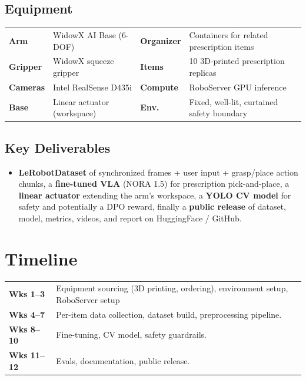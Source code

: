 \documentclass[11.5pt,a4paper]{article}
\begin{document}
\subsection*{Equipment}
\vspace{2pt}
{\normalsize
\begin{tabular}{@{}ll@{\hspace{2.5em}}ll@{}}
\toprule
\textbf{Arm} & WidowX AI Base (6-DOF) & \textbf{Organizer} & Containers for related prescription items \\
\textbf{Gripper} & WidowX squeeze gripper & \textbf{Items} & 10 3D-printed prescription replicas \\
\textbf{Cameras} & Intel RealSense D435i & \textbf{Compute} & RoboServer GPU inference \\
\textbf{Base} & Linear actuator (workspace) & \textbf{Env.} & Fixed, well-lit, curtained safety boundary \\
\bottomrule
\end{tabular}
}

\subsection*{Key Deliverables}
\begin{itemize}
\item \textbf{LeRobotDataset} of synchronized frames + user input + grasp/place action chunks, a \textbf{fine-tuned VLA} (NORA 1.5) for prescription pick-and-place, a \textbf{linear actuator} extending the arm's workspace, a \textbf{YOLO CV model} for safety and potentially a DPO reward, finally a \textbf{public release} of dataset, model, metrics, videos, and report on HuggingFace / GitHub.
\end{itemize}

\section*{Timeline}
\vspace{2pt}
{\normalsize
\begin{tabular}{@{}lp{12.8cm}@{}}
\toprule
\textbf{Wks 1--3} & Equipment sourcing (3D printing, ordering), environment setup, RoboServer setup \\
\textbf{Wks 4--7} & Per-item data collection, dataset build, preprocessing pipeline. \\
\textbf{Wks 8--10} & Fine-tuning, CV model, safety guardrails. \\
\textbf{Wks 11--12} & Evals, documentation, public release. \\
\bottomrule
\end{tabular}
}
\end{document}

